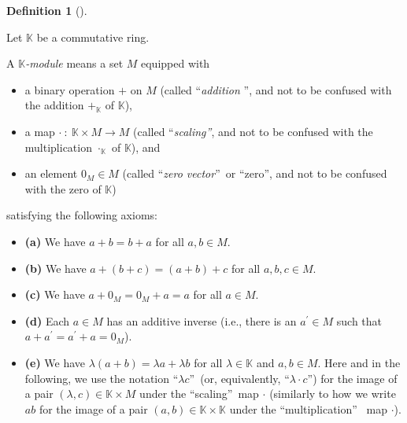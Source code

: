 \documentclass[numbers=enddot,12pt,final,onecolumn,notitlepage]{scrartcl}%
\theoremstyle{definition}
\newtheorem{defi}[theo]{Definition}
\newenvironment{definition}[1][]
{\begin{defi}[#1]\begin{leftbar}}
{\end{leftbar}\end{defi}}
\begin{document}
\begin{definition}
\label{def.module.module}Let $\mathbb{K}$ be a commutative ring.

A $\mathbb{K}$\textit{-module} means a set $M$ equipped with

\begin{itemize}
\item a binary operation $+$ on $M$ (called \textquotedblleft\textit{addition}%
\textquotedblright, and not to be confused with the addition $+_{\mathbb{K}}$
of $\mathbb{K}$),

\item a map $\cdot\ :\ \mathbb{K}\times M\rightarrow M$ (called
\textquotedblleft\textit{scaling\textquotedblright}, and not to be confused
with the multiplication $\cdot_{\mathbb{K}}$ of $\mathbb{K}$), and

\item an element $0_{M}\in M$ (called \textquotedblleft\textit{zero
vector}\textquotedblright\ or \textquotedblleft zero\textquotedblright, and
not to be confused with the zero of $\mathbb{K}$)
\end{itemize}

\noindent satisfying the following axioms:

\begin{itemize}
\item \textbf{(a)} We have $a+b=b+a$ for all $a,b\in M$.

\item \textbf{(b)} We have $a+\left(  b+c\right)  =\left(  a+b\right)  +c$ for
all $a,b,c\in M$.

\item \textbf{(c)} We have $a+0_{M}=0_{M}+a=a$ for all $a\in M$.

\item \textbf{(d)} Each $a\in M$ has an additive inverse (i.e., there is an
$a^{\prime}\in M$ such that $a+a^{\prime}=a^{\prime}+a=0_{M}$).

\item \textbf{(e)} We have $\lambda\left(  a+b\right)  =\lambda a+\lambda b$
for all $\lambda\in\mathbb{K}$ and $a,b\in M$. Here and in the following, we
use the notation \textquotedblleft$\lambda c$\textquotedblright\ (or,
equivalently, \textquotedblleft$\lambda\cdot c$\textquotedblright) for the
image of a pair $\left(  \lambda,c\right)  \in\mathbb{K}\times M$ under the
\textquotedblleft scaling\textquotedblright\ map $\cdot$ (similarly to how we
write $ab$ for the image of a pair $\left(  a,b\right)  \in\mathbb{K}%
\times\mathbb{K}$ under the \textquotedblleft multiplication\textquotedblright%
\ map $\cdot$).


\end{itemize}
\end{definition}
\end{document}
